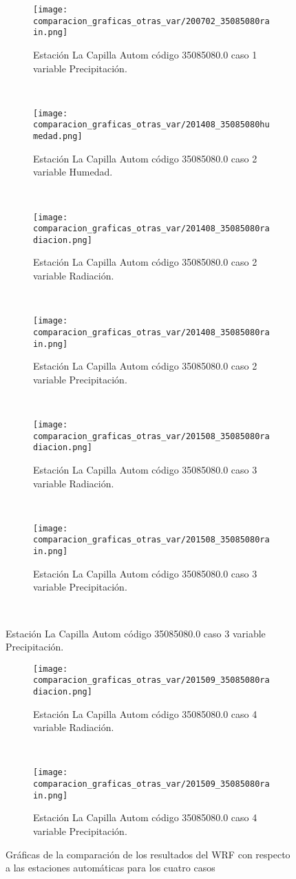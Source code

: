 \begin{figure}[H]
\centering
\begin{subfigure}[normla]{0.4\textwidth}
\caption{Estación La Capilla Autom código 35085080.0 caso 1 variable Precipitación.}
\texttt{[image: comparacion\_graficas\_otras\_var/200702\_35085080rain.png]}
\end{subfigure}
~
\begin{subfigure}[normla]{0.4\textwidth}
\caption{Estación La Capilla Autom código 35085080.0 caso 2 variable Humedad.}
\texttt{[image: comparacion\_graficas\_otras\_var/201408\_35085080humedad.png]}
\end{subfigure}
~
\begin{subfigure}[normla]{0.4\textwidth}
\caption{Estación La Capilla Autom código 35085080.0 caso 2 variable Radiación.}
\texttt{[image: comparacion\_graficas\_otras\_var/201408\_35085080radiacion.png]}
\end{subfigure}
~
\begin{subfigure}[normla]{0.4\textwidth}
\caption{Estación La Capilla Autom código 35085080.0 caso 2 variable Precipitación.}
\texttt{[image: comparacion\_graficas\_otras\_var/201408\_35085080rain.png]}
\end{subfigure}
~
\begin{subfigure}[normla]{0.4\textwidth}
\caption{Estación La Capilla Autom código 35085080.0 caso 3 variable Radiación.}
\texttt{[image: comparacion\_graficas\_otras\_var/201508\_35085080radiacion.png]}
\end{subfigure}
~
\begin{subfigure}[normla]{0.4\textwidth}
\caption{Estación La Capilla Autom código 35085080.0 caso 3 variable Precipitación.}
\texttt{[image: comparacion\_graficas\_otras\_var/201508\_35085080rain.png]}
\end{subfigure}
~
\end{figure}
           
\begin{figure}[H]
\centering
\begin{subfigure}[normla]{0.4\textwidth}
\caption{Estación La Capilla Autom código 35085080.0 caso 4 variable Radiación.}
\texttt{[image: comparacion\_graficas\_otras\_var/201509\_35085080radiacion.png]}
\end{subfigure}
~
\begin{subfigure}[normla]{0.4\textwidth}
\caption{Estación La Capilla Autom código 35085080.0 caso 4 variable Precipitación.}
\texttt{[image: comparacion\_graficas\_otras\_var/201509\_35085080rain.png]}
\end{subfigure}
    
    
    
    \caption{Gráficas de la comparación de los resultados del WRF con respecto a las estaciones automáticas para los cuatro casos}
    \label{fig:my_label}
\end{figure}